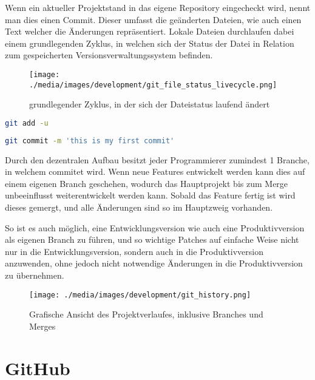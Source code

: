Wenn ein aktueller Projektstand in das eigene Repository eingecheckt wird, nennt man dies einen Commit. Dieser umfasst die ge\"anderten Dateien, wie auch einen Text welcher die \"Anderungen repr\"asentiert. Lokale Dateien durchlaufen dabei einem grundlegenden Zyklus, in welchen sich der Status der Datei in Relation zum gespeicherten Versionsverwaltungssystem befinden.

\begin{figure}[h]
\centering
\texttt{[image: ./media/images/development/git\_file\_status\_livecycle.png]}
\caption{grundlegender Zyklus, in der sich der Dateistatus laufend \"andert}
\label{git_file_status_livecycle}
\end{figure}


\begin{lstlisting}[language=bash]
git add -u
\end{lstlisting}


\begin{lstlisting}[language=bash]
git commit -m 'this is my first commit'
\end{lstlisting}

\newpage

Durch den dezentralen Aufbau besitzt jeder Programmierer zumindest 1 Branche, in welchem commitet wird. Wenn neue Features entwickelt werden kann dies auf einem eigenen Branch geschehen, wodurch das Hauptprojekt bis zum Merge unbeeinflusst weiterentwickelt werden kann. Sobald das Feature fertig ist wird dieses gemergt, und alle \"Anderungen sind so im Hauptzweig vorhanden.

So ist es auch m\"oglich, eine Entwicklungsversion wie auch eine Produktivversion als eigenen Branch zu f\"uhren, und so wichtige Patches auf einfache Weise nicht nur in die Entwicklungsversion, sondern auch in die Produktivversion anzuwenden, ohne jedoch nicht notwendige \"Anderungen in die Produktivversion zu \"ubernehmen.

\begin{figure}[h]
\centering
\texttt{[image: ./media/images/development/git\_history.png]}
\caption{Grafische Ansicht des Projektverlaufes, inklusive Branches und  Merges}
\label{development_git_history}
\end{figure}

\section{GitHub}

